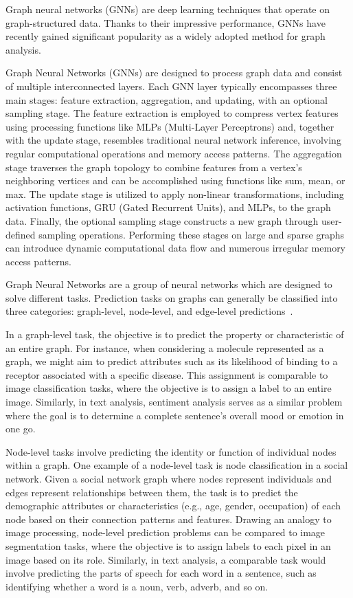 \documentclass{Configuration_Files/PoliMi3i_thesis}
\begin{document}
    Graph neural networks (GNNs) are deep learning techniques that operate on graph-structured data.
    Thanks to their impressive performance, GNNs have recently gained significant popularity as a widely adopted method for graph analysis.

    Graph Neural Networks (GNNs) are designed to process graph data and consist of multiple interconnected layers.
    Each GNN layer typically encompasses three main stages: feature extraction, aggregation, and updating, with an optional sampling stage.
    The feature extraction is employed to compress vertex features using processing functions like MLPs (Multi-Layer Perceptrons) and, together with the update stage, resembles traditional neural network inference, involving regular computational operations and memory access patterns.
    The aggregation stage traverses the graph topology to combine features from a vertex's neighboring vertices and can be accomplished using functions like sum, mean, or max.
    The update stage is utilized to apply non-linear transformations, including activation functions, GRU (Gated Recurrent Units), and MLPs, to the graph data.
    Finally, the optional sampling stage constructs a new graph through user-defined sampling operations.
    Performing these stages on large and sparse graphs can introduce dynamic computational data flow and numerous irregular memory access patterns.

    Graph Neural Networks are a group of neural networks which are designed to solve different tasks.
    Prediction tasks on graphs can generally be classified into three categories: graph-level, node-level, and edge-level predictions~\cite{sanchez-lengeling2021a}.

    In a graph-level task, the objective is to predict the property or characteristic of an entire graph.
    For instance, when considering a molecule represented as a graph, we might aim to predict attributes such as its likelihood of binding to a receptor associated with a specific disease.
    This assignment is comparable to image classification tasks, where the objective is to assign a label to an entire image.
    Similarly, in text analysis, sentiment analysis serves as a similar problem where the goal is to determine a complete sentence's overall mood or emotion in one go.

    Node-level tasks involve predicting the identity or function of individual nodes within a graph.
    One example of a node-level task is node classification in a social network.
    Given a social network graph where nodes represent individuals and edges represent relationships between them, the task is to predict the demographic attributes or characteristics (e.g., age, gender, occupation) of each node based on their connection patterns and features.
    Drawing an analogy to image processing, node-level prediction problems can be compared to image segmentation tasks, where the objective is to assign labels to each pixel in an image based on its role.
    Similarly, in text analysis, a comparable task would involve predicting the parts of speech for each word in a sentence, such as identifying whether a word is a noun, verb, adverb, and so on.
\end{document}
